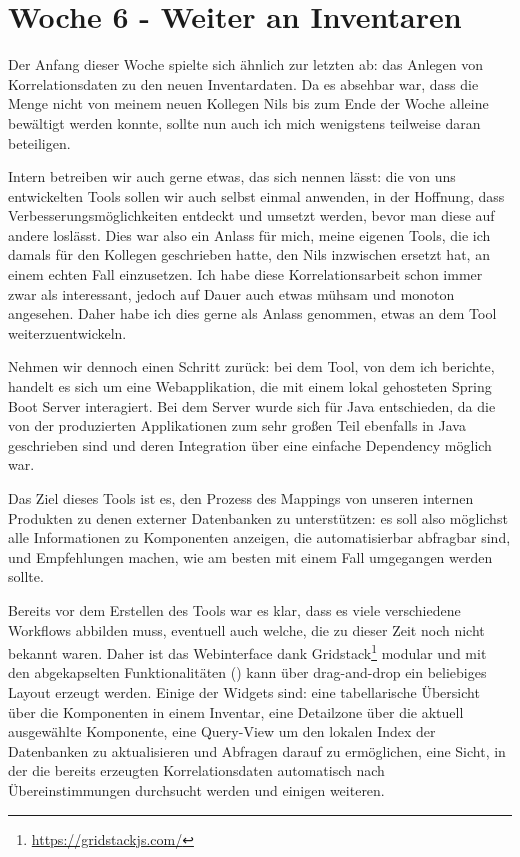 \section{Woche 6 - Weiter an Inventaren} \label{sec:bericht-wo-6}

Der Anfang dieser Woche spielte sich ähnlich zur letzten ab: das Anlegen von Korrelationsdaten zu den neuen Inventardaten.
Da es absehbar war, dass die Menge nicht von meinem neuen Kollegen Nils bis zum Ende der Woche alleine bewältigt werden konnte, sollte nun auch ich mich wenigstens teilweise daran beteiligen.

Intern betreiben wir auch gerne etwas, das sich  nennen lässt: die von uns entwickelten Tools sollen wir auch selbst einmal anwenden, in der Hoffnung, dass Verbesserungsmöglichkeiten entdeckt und umsetzt werden, bevor man diese auf andere loslässt.
Dies war also ein Anlass für mich, meine eigenen Tools, die ich damals für den Kollegen geschrieben hatte, den Nils inzwischen ersetzt hat, an einem echten Fall einzusetzen.
Ich habe diese Korrelationsarbeit schon immer zwar als interessant, jedoch auf Dauer auch etwas mühsam und monoton angesehen.
Daher habe ich dies gerne als Anlass genommen, etwas an dem Tool weiterzuentwickeln.

Nehmen wir dennoch einen Schritt zurück:
bei dem Tool, von dem ich berichte, handelt es sich um eine Webapplikation, die mit einem lokal gehosteten Spring Boot Server interagiert.
Bei dem Server wurde sich für Java entschieden, da die von der \metaeffekt produzierten Applikationen zum sehr großen Teil ebenfalls in Java geschrieben sind und deren Integration über eine einfache Dependency möglich war.

Das Ziel dieses Tools ist es, den Prozess des Mappings von unseren internen Produkten zu denen externer Datenbanken zu unterstützen:
es soll also möglichst alle Informationen zu Komponenten anzeigen, die automatisierbar abfragbar sind, und Empfehlungen machen, wie am besten mit einem Fall umgegangen werden sollte.

Bereits vor dem Erstellen des Tools war es klar, dass es viele verschiedene Workflows abbilden muss, eventuell auch welche, die zu dieser Zeit noch nicht bekannt waren.
Daher ist das Webinterface dank Gridstack\footnote{\url{https://gridstackjs.com/}} modular und mit den abgekapselten Funktionalitäten () kann über drag-and-drop ein beliebiges Layout erzeugt werden.
Einige der Widgets sind:
eine tabellarische Übersicht über die Komponenten in einem Inventar, eine Detailzone über die aktuell ausgewählte Komponente,
eine Query-View um den lokalen Index der Datenbanken zu aktualisieren und Abfragen darauf zu ermöglichen, eine Sicht,
in der die bereits erzeugten Korrelationsdaten automatisch nach Übereinstimmungen durchsucht werden und einigen weiteren.

